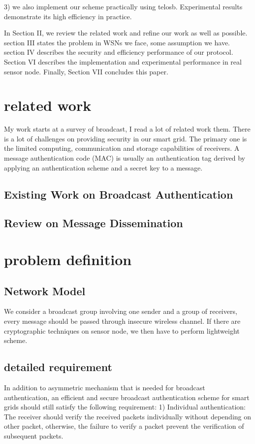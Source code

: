 \documentclass[lnicst,sechang,a4paper]{svmultln}
\begin{document}
3) we also implement our scheme practically using telosb. Experimental results demonstrate its high efficiency in practice.

In Section II, we review the related work and refine our work as well as possible. section III states the problem in WSNs we face, some assumption we have. section IV describes the security and efficiency performance of our protocol. Section VI describes the implementation and experimental performance in real sensor node. Finally, Section VII concludes this paper. 

\section{related work}
My work starts at a survey of broadcast, I read a lot of related work them.
There is a lot of challenges on providing security in our smart grid. The primary one is the limited computing, communication and storage capabilities of receivers. A message authentication code (MAC) is usually an authentication tag derived by applying an authentication scheme and a secret key to a  message.
\subsection{Existing Work on Broadcast Authentication}
\subsection{Review on Message Dissemination}
\section{problem definition}
\subsection{Network Model}
We consider a broadcast group involving one sender and a group of receivers, every message should be passed through insecure wireless channel. If there are cryptographic techniques on sensor node, we then have to perform  lightweight scheme. 

\subsection{detailed requirement}
 	In addition to asymmetric mechanism that is needed for broadcast authentication, an efficient and secure broadcast authentication scheme for smart grids should still satisfy the following requirement: 
 	1) Individual authentication: The receiver should verify the received packets individually without depending on other packet, otherwise, the failure to verify a packet prevent the verification of subsequent packets.
 	
\end{document}
